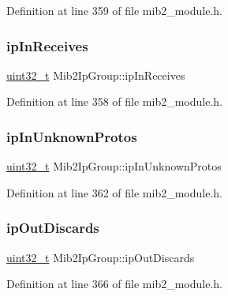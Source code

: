 Definition at line 359 of file mib2\+\_\+module.\+h.

\mbox{\label{structMib2IpGroup_a9938034ea51258423ec11ea50dbbd48c}} 
\subsubsection{\texorpdfstring{ip\+In\+Receives}{ipInReceives}}
{\footnotesize\ttfamily \hyperlink{stdint_8h_a435d1572bf3f880d55459d9805097f62}{uint32\+\_\+t} Mib2\+Ip\+Group\+::ip\+In\+Receives}



Definition at line 358 of file mib2\+\_\+module.\+h.

\mbox{\label{structMib2IpGroup_a9619ca18408c9f456ef26a2dd51c9a40}} 
\subsubsection{\texorpdfstring{ip\+In\+Unknown\+Protos}{ipInUnknownProtos}}
{\footnotesize\ttfamily \hyperlink{stdint_8h_a435d1572bf3f880d55459d9805097f62}{uint32\+\_\+t} Mib2\+Ip\+Group\+::ip\+In\+Unknown\+Protos}



Definition at line 362 of file mib2\+\_\+module.\+h.

\mbox{\label{structMib2IpGroup_af134164fa458e68e2c9ba286397e0d87}} 
\subsubsection{\texorpdfstring{ip\+Out\+Discards}{ipOutDiscards}}
{\footnotesize\ttfamily \hyperlink{stdint_8h_a435d1572bf3f880d55459d9805097f62}{uint32\+\_\+t} Mib2\+Ip\+Group\+::ip\+Out\+Discards}



Definition at line 366 of file mib2\+\_\+module.\+h.

